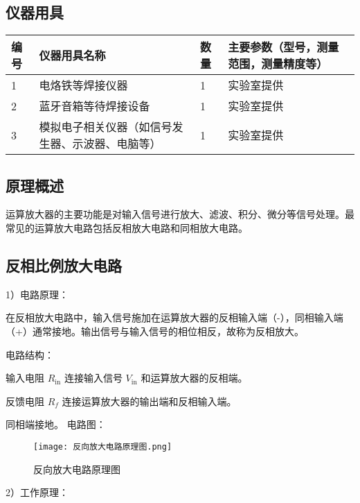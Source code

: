 \documentclass[dvipsnames, svgnames,a4paper,11pt]{article}
\begin{document}
\subsection{仪器用具}
\begin{table}[htbp]
	\centering
	\renewcommand\arraystretch{1.6}
	\begin{tabular}{p{}|p{}|p{}|p{}}
	\hline
	编号& 仪器用具名称 & 数量 &  主要参数（型号，测量范围，测量精度等） \\
	\hline
	1&电烙铁等焊接仪器 &1 & 实验室提供\\
	2&蓝牙音箱等待焊接设备 &1 & 实验室提供\\
	3&模拟电子相关仪器（如信号发生器、示波器、电脑等） &1 & 实验室提供 \\
	\hline
\end{tabular}
\end{table}

\subsection{原理概述}

		运算放大器的主要功能是对输入信号进行放大、滤波、积分、微分等信号处理。最常见的运算放大电路包括反相放大电路和同相放大电路。
	
		\subsection{反相比例放大电路}
			1）电路原理：

			在反相放大电路中，输入信号施加在运算放大器的反相输入端（-），同相输入端（+）通常接地。输出信号与输入信号的相位相反，故称为反相放大。

			\vspace{1cm}
			电路结构：

			输入电阻 \( R_{\text{in}} \) 连接输入信号 \( V_{\text{in}} \) 和运算放大器的反相端。
			
			反馈电阻 \( R_f \) 连接运算放大器的输出端和反相输入端。
			
			同相端接地。
			\vspace{1cm}
			电路图：
			\begin{figure}[htbp]
				\centering
				\texttt{[image: 反向放大电路原理图.png]}
				\caption{反向放大电路原理图}
				\label{fig:反向放大电路原理图}
			\end{figure}
			
			2）工作原理：
\end{document}
